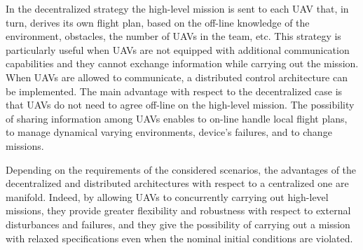 \documentclass[letterpaper, 10 pt, conference]{ieeeconf}
\begin{document}
%
In the decentralized strategy the high-level mission is sent to each UAV that, in turn, derives its own flight plan, based on the off-line knowledge of the environment, obstacles, the number of UAVs in the team, etc. This strategy is particularly useful when UAVs are not equipped with additional communication capabilities and they cannot exchange information while carrying out the mission. 
%
When UAVs are allowed to communicate, a distributed control architecture can be implemented. The main advantage with respect to the decentralized case is that UAVs do not need to agree off-line on the high-level mission. The possibility of sharing information among UAVs enables to on-line handle local flight plans, to manage dynamical varying environments, device's failures, and to change missions. 

Depending on the requirements of the considered scenarios, the advantages of the decentralized and distributed architectures with respect to a centralized one are manifold. Indeed, by allowing UAVs to concurrently carrying out high-level missions, they provide greater flexibility and robustness with respect to external disturbances and failures, and they give the possibility of carrying out a mission with relaxed specifications even when the nominal initial conditions are violated.
\end{document}
